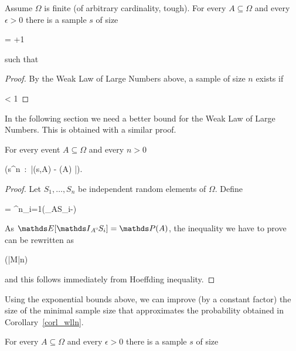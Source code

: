 \documentclass[scombinatorics.tex]{subfiles}
\begin{document}
{\begin{corollary}\label{corl_wlln}
  Assume $\Omega$ is finite (of arbitrary cardinality, tough).
  For every $A\subseteq\Omega$ and every $\epsilon>0$ there is a sample $s$ of size

      {=}
      {\left\lfloor{}+1\right\rfloor} 
      
  such that

\end{corollary}


\begin{proof}
  By the Weak Law of Large Numbers above, a sample of size $n$ exists if

      {<}
      {1}
\end{proof}

In the following section we need a better bound for the Weak Law of Large Numbers.
This is obtained with a similar proof.

\begin{void_thm}
  For every event $A\subseteq\Omega$ and every $n>0$
  
  {\ge}
  {\Pr \Big(s\in\Omega^n\ :\ \big|\Fr(s,A) - \Pr(A)  \big|\ge\epsilon\Big).}
\end{void_thm}

\begin{proof}
  Let $S_1,\dots,S_n$ be independent random elements of $\Omega$.
  Define
  
  {=}
  {\sum^n_{i=1}\Big(\Indicator_A\smallcirc S_i-\Big)}

  As $\Ex[\Indicator_A\smallcirc S_i]=\Pr(A)$, the inequality we have to prove can be rewritten as 

  {\ge}
  {\Pr \Big(|M|\ge n\epsilon\Big)}

  and this follows immediately from Hoeffding inequality.
  \end{proof}


Using the exponential bounds above, we can improve (by a constant factor) the size of the minimal sample size that approximates the probability obtained in Corollary~\ref{corl_wlln}.

\begin{corollary}
  For every $A\subseteq\Omega$ and every $\epsilon>0$ there is a sample $s$ of size


\end{corollary}}
\end{document}
